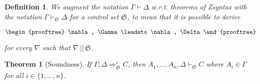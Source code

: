 \documentclass{article}
\newtheorem{theorem}{Theorem}
\newtheorem{definition}{Definition}
\newcommand{\ctrlset}[1]{\mathfrak{S}_{#1}}
\newcommand{\respects}[2]{#1 \, || \, #2}
\begin{document}
\begin{definition}
  We augment the notation $\Gamma \vdash \Delta$ w.r.t. theorems of Zsyntax with
  the notation $\Gamma \vdash_{\ctrlset{}} \Delta$ for a control set
  $\ctrlset{}$, to mean that it is possible to derive

  \[
    \begin{prooftree}
      \nabla, \Gamma
      \leadsto
      \nabla, \Delta
    \end{prooftree}
  \]

  for every $\nabla$ such that $\respects{\nabla}{\ctrlset{}}$.
\end{definition}

\begin{theorem}[Soundness]
  If $\Gamma; \Delta \Longrightarrow^c_{\ctrlset{}} C$, then
  $A_1, \dots, A_n, \Delta \vdash_{\ctrlset{}} C$ where $A_i \in \Gamma$ for
  all $i \in \{ 1, \dots, n\}$.
\end{theorem}
\end{document}
